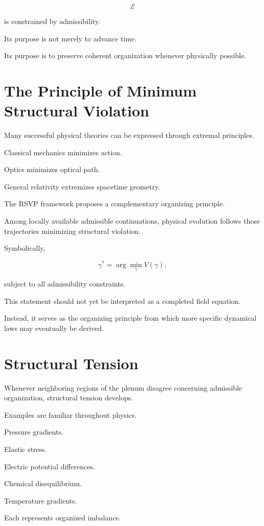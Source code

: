\documentclass[11pt,oneside]{book}
\numberwithin{equation}{chapter}
\theoremstyle{definition}
\theoremstyle{plain}
\begin{document}
\[
\mathcal{E}
\]

is constrained by admissibility.

Its purpose is not merely to advance time.

Its purpose is to preserve coherent organization whenever physically
possible.

\section{The Principle of Minimum Structural Violation}

Many successful physical theories can be expressed through extremal
principles.

Classical mechanics minimizes action.

Optics minimizes optical path.

General relativity extremizes spacetime geometry.

The RSVP framework proposes a complementary organizing principle.

Among locally available admissible continuations, physical evolution follows
those trajectories minimizing structural violation.

Symbolically,

\[
\gamma^{*}
=
\arg\min_{\gamma}
V(\gamma),
\]

subject to all admissibility constraints.

This statement should not yet be interpreted as a completed field equation.

Instead, it serves as the organizing principle from which more specific
dynamical laws may eventually be derived.

\section{Structural Tension}

Whenever neighboring regions of the plenum disagree concerning admissible
organization, structural tension develops.

Examples are familiar throughout physics.

Pressure gradients.

Elastic stress.

Electric potential differences.

Chemical disequilibrium.

Temperature gradients.

Each represents organized imbalance.
\end{document}
